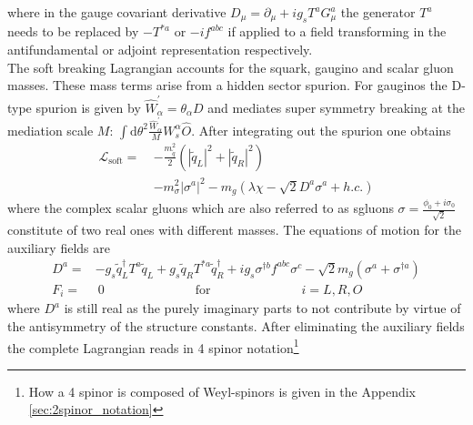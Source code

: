 where in the gauge covariant derivative $D_\mu = \partial_\mu +ig_sT^aG^a_\mu$ the generator $T^a$ needs to be replaced by $-T^{\ast a}$ or $-if^{abc}$ if applied to a field transforming in the antifundamental or adjoint representation respectively.\\
The soft breaking Lagrangian accounts for the squark, gaugino and scalar gluon masses. These mass terms arise from a hidden sector spurion. For gauginos the D-type spurion is given by $\hat{W}_\alpha^\prime = \theta_\alpha D$ and mediates super symmetry breaking at the mediation scale $M$: $\int\mathrm{d}\theta^2\frac{\hat{W}_\alpha^\prime}{M}W_s^\alpha \hat{O}$. After integrating out the spurion one obtains\cite{Fox:2002bu, Diessner:2015bna}
\begin{align}
\mathcal{L}_{\mathrm{soft}} =\ & -\frac{m_{\tilde{q}}^2}{2}(|\tilde{q}_L|^2 + |\tilde{q}_R|^2)\nonumber\\
& -m_{\sigma}^2\left|\sigma^{a}\right|^2 - m_g(\lambda\chi -\sqrt{2}D^a \sigma^a + h.c.)
\end{align}
where the complex scalar gluons which are also referred to as sgluons $\sigma = \frac{\phi_0 + i\sigma_0}{\sqrt{2}}$ constitute of two real ones with different masses.
The equations of motion for the auxiliary fields are
\begin{align}
D^a =& -g_s \tilde{q}_L^\dagger T^a \tilde{q}_L + g_s \tilde{q}_R T^{\ast a} \tilde{q}_R^\dagger + ig_s\sigma^{\dagger b}f^{abc}\sigma^c -\sqrt{2}m_g(\sigma^a + \sigma^{\dagger a})\\
F_i =&\ 0 \hspace{3cm} \mathrm{for} \hspace{3cm} i = L,R,O
\end{align}
where $D^a$ is still real as the purely imaginary parts to not contribute by virtue of the antisymmetry of the structure constants. After eliminating the auxiliary fields the complete Lagrangian reads in 4 spinor notation\footnote{How a 4 spinor is composed of Weyl-spinors is given in the Appendix \ref{sec:2spinor_notation}}
